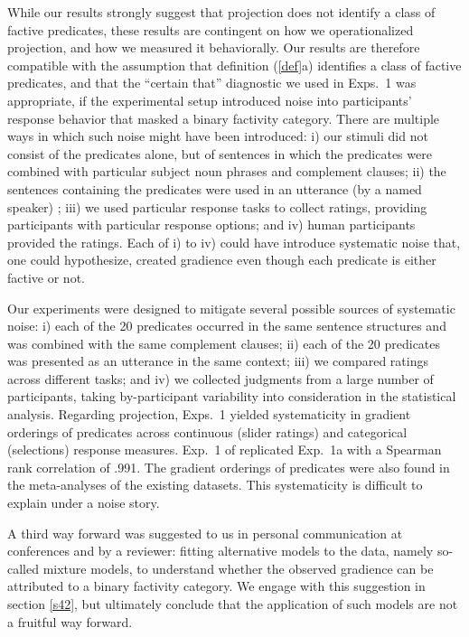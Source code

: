 \documentclass[11pt,fleqn]{article}
\newcommand{\6}{\mbox{$[\hspace*{-.6mm}[$}}
\newcommand{\9}{\mbox{$]\hspace*{-.6mm}]$}}
\begin{document}
While our results strongly suggest that projection does not identify a class of factive predicates, these results are contingent on how we operationalized projection, and how we measured it behaviorally. Our results are therefore compatible with the assumption that definition (\ref{def}a) identifies a class of factive predicates, and that the ``certain that'' diagnostic we used in Exps.~1 was appropriate, if the experimental setup introduced noise into participants' response behavior that masked a binary factivity category. There are multiple ways in which such noise might have been introduced: i) our stimuli did not consist of the predicates alone, but of sentences in which the predicates were combined with particular subject noun phrases and complement clauses; ii) the sentences containing the predicates were used in an utterance (by a named speaker) ; iii) we used particular response tasks to collect ratings, providing participants with particular response options; and iv) human participants provided the ratings. Each of i) to iv) could have introduce systematic noise that, one could hypothesize, created gradience even though each predicate is either factive or not. 

Our experiments were designed to mitigate several possible sources of systematic noise: i) each of the 20 predicates occurred in the same sentence structures and was combined with the same complement clauses; ii) each of the 20 predicates was presented as an utterance in the same context; iii) we compared ratings across different tasks; and iv) we collected judgments from a large number of participants, taking by-participant variability into consideration in the statistical analysis. Regarding projection, Exps.~1 yielded systematicity in gradient orderings of predicates across continuous (slider ratings) and categorical (selections) response measures. Exp.~1 of \citealt{degen-tonhauser-openmind} replicated Exp.~1a with a Spearman rank correlation of .991. The gradient orderings of predicates were also found in the meta-analyses of the existing datasets. This systematicity is difficult to explain under a noise story. 

A third way forward was suggested to us in personal communication at conferences and by a reviewer: fitting alternative models to the data, namely so-called mixture models, to understand whether the observed gradience can be attributed to a binary factivity category. We engage with this suggestion in section \ref{s42}, but ultimately conclude that the application of such models are not a fruitful way forward.
\end{document}

